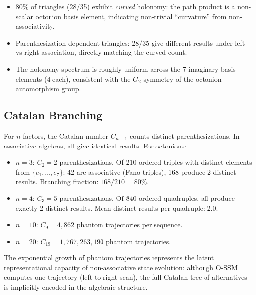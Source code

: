 \documentclass{article}
\begin{document}
\begin{itemize}
    \item 80\% of triangles (28/35) exhibit \emph{curved} holonomy: the path product is a non-scalar octonion basis element, indicating non-trivial ``curvature'' from non-associativity.
    \item Parenthesization-dependent triangles: 28/35 give different results under left- vs right-association, directly matching the curved count.
    \item The holonomy spectrum is roughly uniform across the 7 imaginary basis elements (4 each), consistent with the $G_2$ symmetry of the octonion automorphism group.
\end{itemize}

\subsection{Catalan Branching}

For $n$ factors, the Catalan number $C_{n-1}$ counts distinct parenthesizations.
In associative algebras, all give identical results.
For octonions:

\begin{itemize}
    \item \textbf{$n=3$}: $C_2 = 2$ parenthesizations.
    Of 210 ordered triples with distinct elements from $\{e_1, \ldots, e_7\}$:
    42 are associative (Fano triples), 168 produce 2 distinct results.
    Branching fraction: $168/210 = 80\%$.
    \item \textbf{$n=4$}: $C_3 = 5$ parenthesizations.
    Of 840 ordered quadruples, all produce exactly 2 distinct results.
    Mean distinct results per quadruple: 2.0.
    \item \textbf{$n=10$}: $C_9 = 4{,}862$ phantom trajectories per sequence.
    \item \textbf{$n=20$}: $C_{19} = 1{,}767{,}263{,}190$ phantom trajectories.
\end{itemize}

The exponential growth of phantom trajectories represents the latent representational capacity of non-associative state evolution: although O-SSM computes one trajectory (left-to-right scan), the full Catalan tree of alternatives is implicitly encoded in the algebraic structure.

\end{document}

